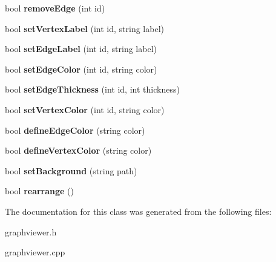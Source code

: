 \begin{DoxyCompactItemize}
\item 
\hypertarget{class_graph_viewer_a9a8ee68c7c12b373affbe4069dd95d72}{bool {\bfseries remove\-Edge} (int id)}\label{class_graph_viewer_a9a8ee68c7c12b373affbe4069dd95d72}

\item 
\hypertarget{class_graph_viewer_ac25d7d007022fda16799808ba136e909}{bool {\bfseries set\-Vertex\-Label} (int id, string label)}\label{class_graph_viewer_ac25d7d007022fda16799808ba136e909}

\item 
\hypertarget{class_graph_viewer_a447cca0064e785654c2105602c2961ca}{bool {\bfseries set\-Edge\-Label} (int id, string label)}\label{class_graph_viewer_a447cca0064e785654c2105602c2961ca}

\item 
\hypertarget{class_graph_viewer_a07ccc96707efae4aa5f3ced3dca015af}{bool {\bfseries set\-Edge\-Color} (int id, string color)}\label{class_graph_viewer_a07ccc96707efae4aa5f3ced3dca015af}

\item 
\hypertarget{class_graph_viewer_a07f598272fe3515455eab13be749604a}{bool {\bfseries set\-Edge\-Thickness} (int id, int thickness)}\label{class_graph_viewer_a07f598272fe3515455eab13be749604a}

\item 
\hypertarget{class_graph_viewer_a8b542d7e09e81a45a74760c19233beb0}{bool {\bfseries set\-Vertex\-Color} (int id, string color)}\label{class_graph_viewer_a8b542d7e09e81a45a74760c19233beb0}

\item 
\hypertarget{class_graph_viewer_a4102580b69826ba83251ef7bb262f8be}{bool {\bfseries define\-Edge\-Color} (string color)}\label{class_graph_viewer_a4102580b69826ba83251ef7bb262f8be}

\item 
\hypertarget{class_graph_viewer_a76de8676b7a93d72af514b84cdaa4d21}{bool {\bfseries define\-Vertex\-Color} (string color)}\label{class_graph_viewer_a76de8676b7a93d72af514b84cdaa4d21}

\item 
\hypertarget{class_graph_viewer_a02437b5fecd8b90de24436068312d593}{bool {\bfseries set\-Background} (string path)}\label{class_graph_viewer_a02437b5fecd8b90de24436068312d593}

\item 
\hypertarget{class_graph_viewer_a3009a66958686ccb7e78b68e37c3c423}{bool {\bfseries rearrange} ()}\label{class_graph_viewer_a3009a66958686ccb7e78b68e37c3c423}

\end{DoxyCompactItemize}


The documentation for this class was generated from the following files\-:\begin{DoxyCompactItemize}
\item 
graphviewer.\-h\item 
graphviewer.\-cpp\end{DoxyCompactItemize}
